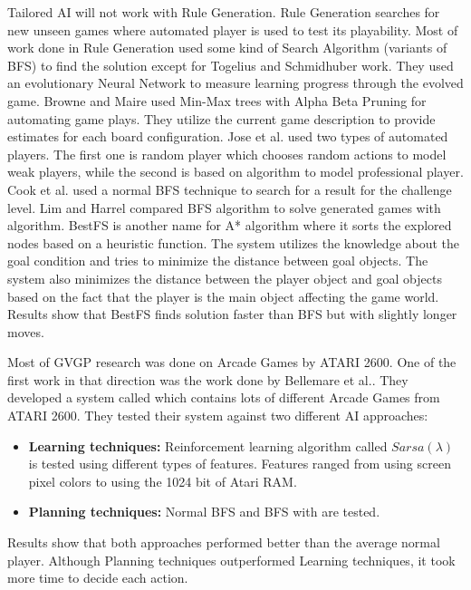 Tailored AI will not work with Rule Generation. Rule Generation searches for new unseen games where automated player is used to test its playability. Most of work done in Rule Generation used some kind of Search Algorithm (variants of BFS) to find the solution except for Togelius and Schmidhuber\cite{arcadeHillClimber} work. They used an evolutionary Neural Network to measure learning progress through the evolved game. Browne and Maire\cite{evolveBrowne} used Min-Max trees with Alpha Beta Pruning for automating game plays. They utilize the current game description to provide estimates for each board configuration. Jose et al.\cite{generationCardGames} used two types of automated players. The first one is random player which chooses random actions to model weak players, while the second is based on  algorithm to model professional player. Cook et al.\cite{mechanicMiner} used a normal BFS technique to search for a result for the challenge level. Lim and Harrel\cite{puzzleScriptGeneration} compared BFS algorithm to solve generated games with  algorithm. BestFS is another name for A* algorithm where it sorts the explored nodes based on a heuristic function. The system utilizes the knowledge about the goal condition and tries to minimize the distance between goal objects. The system also minimizes the distance between the player object and goal objects based on the fact that the player is the main object affecting the game world. Results show that BestFS finds solution faster than BFS but with slightly longer moves.\\\par

Most of GVGP research was done on Arcade Games by ATARI 2600. One of the first work in that direction was the work done by Bellemare et al.\cite{arcadeLearningEnviroment}. They developed a system called  which contains lots of different Arcade Games from ATARI 2600. They tested their system against two different AI approaches:
\begin{itemize} \itemsep0pt \parskip0pt 
	\item \textbf{Learning techniques:} Reinforcement learning algorithm called $Sarsa(\lambda)$ is tested using different types of features. Features ranged from using screen pixel colors to using the 1024 bit of Atari RAM.
	\item \textbf{Planning techniques:} Normal BFS and BFS with  are tested.
\end{itemize}
Results show that both approaches performed better than the average normal player. Although Planning techniques outperformed Learning techniques, it took more time to decide each action.\\\par

